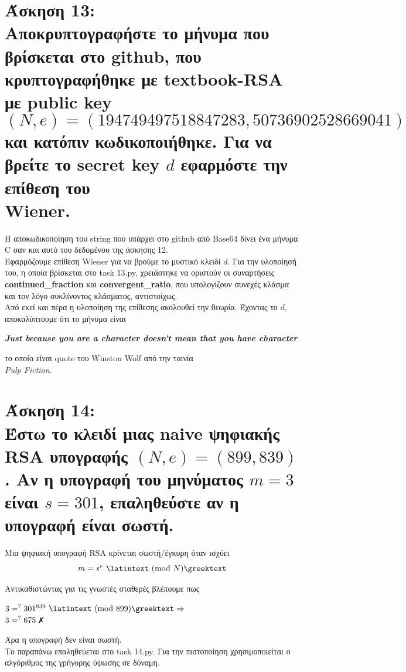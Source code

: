\documentclass{article}
\newcommand{\lt}[1]{\latintext #1\greektext}
\newcommand{\task}[2]{\newpage\section*{Άσκηση #1:\\#2}}
\newcommand{\blt}[1]{\lt{\textbf{#1}}}
\newcommand{\myxmark}{\ding{55}}
\begin{document}
\task{13}{
    Αποκρυπτογραφήστε το μήνυμα που\\ βρίσκεται στο \lt{github}, που κρυπτογραφήθηκε με \lt{textbook-RSA} με \lt{public key}
    \[(N, e) = (194749497518847283, 50736902528669041)\]
    και κατόπιν κωδικοποιήθηκε. Για να βρείτε το \lt{secret key $d$} εφαρμόστε την επίθεση του\\ \lt{Wiener}.
}
{
    Η αποκωδικοποίηση του \lt{string} που υπάρχει στο \lt{github} από \lt{Base64} δίνει ένα μήνυμα \lt{C} σαν και αυτό του δεδομένου της άσκησης 12.\\
    
    Εφαρμόζουμε επίθεση \lt{Wiener} για να βρούμε το μυστικό κλειδί $d$. Για την υλοποίησή του, η οποία βρίσκεται στο \lt{task 13.py}, χρειάστηκε να οριστούν οι συναρτήσεις \blt{continued\_fraction} και \blt{convergent\_ratio}, που υπολογίζουν συνεχές κλάσμα και τον λόγο συκλίνοντος κλάσματος, αντιστοίχως.\\
    
    Από εκεί και πέρα η υλοποίηση της επίθεσης ακολουθεί την θεωρία. Έχοντας το $d$, αποκαλύπτουμε ότι το μήνυμα είναι
    \begin{center}
        \blt{\textit{ Just because you are a character doesn't mean that you have character}}
    \end{center}
    το οποίο είναι \lt{quote} του \lt{Winston Wolf} από την ταινία\\ \lt{\textit{Pulp Fiction}}.
}

\task{14}{
    Έστω το κλειδί μιας \lt{naive} ψηφιακής \lt{RSA} υπογραφής $(N, e) = (899, 839)$. Αν η υπογραφή του μηνύματος $m = 3$ είναι $s = 301$, επαληθεύστε αν η υπογραφή είναι σωστή.
}
{
    Μια ψηφιακή υπογραφή \lt{RSA} κρίνεται σωστή/έγκυρη όταν ισχύει
    \begin{equation*}
        m = s^e \text{ \lt{(mod $N$)}}
    \end{equation*}
    
    Αντικαθιστώντας για τις γνωστές σταθερές βλέπουμε πως
    \begin{center}
        $3 =^? 301^{839} \text{ \lt{(mod 899)}} \Rightarrow$\\
        $3 =^? 675 \text{ \myxmark}$
    \end{center}
    Άρα η υπογραφή δεν είναι σωστή.\\
    
    Το παραπάνω επαληθεύεται στο \lt{task 14.py}. Για την πιστοποίηση χρησιμοποιείται ο αλγόριθμος της γρήγορης ύψωσης σε δύναμη.
}
\end{document}
